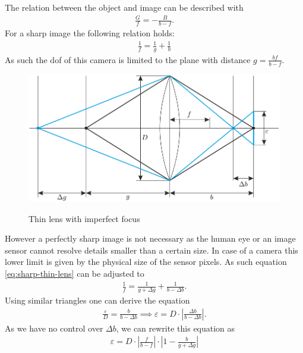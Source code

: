 The relation between the object and image can be described with
\begin{align}
    \frac{G}{f} = - \frac{B}{b-f}.
\end{align}
For a sharp image the following relation holds:
\begin{align}
    \frac{1}{f} = \frac{1}{g} + \frac{1}{b}
    \label{eq:sharp-thin-lens}
\end{align}
As such the \gls{dof} of this camera is limited to the plane with distance $g = \frac{bf}{b-f}$.
\begin{figure}[h]
    \centering
    \includegraphics[width=\textwidth]{images/coc.png}
    \caption{Thin lens with imperfect focus}
    \label{fig:coc-thin-lens}
    \cite{Beyerer.2016}
\end{figure}
However a perfectly sharp image is not necessary as the human eye or an image sensor cannot resolve details smaller than a certain size.
In case of a camera this lower limit is given by the physical size of the sensor pixels.
As such equation \ref{eq:sharp-thin-lens} can be adjusted to
\begin{align}
    \frac{1}{f} = \frac{1}{g + \Delta g} + \frac{1}{b - \Delta b}.
\end{align}
Using similar triangles one can derive the equation
\begin{align}
    \frac{\varepsilon}{D} = \frac{b}{b - \Delta b} \implies \varepsilon = D \cdot |\frac{\Delta b}{b - \Delta b}|.
    \label{eq:coc}
\end{align}
As we have no control over $\Delta b$, we can rewrite this equation as
\begin{align}
    \varepsilon = D \cdot |\frac{f}{b-f}| \cdot |1 - \frac{b}{g + \Delta g}|
\end{align}

